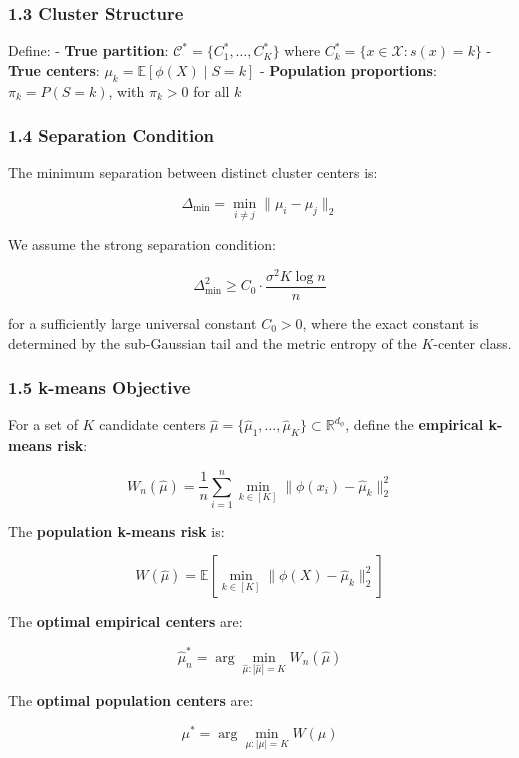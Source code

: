 \documentclass[
  12pt,
]{article}
\begin{document}
\subsubsection{1.3 Cluster Structure}\label{cluster-structure}

Define: - \textbf{True partition}:
\(\mathcal{C}^* = \{C_1^*, \dots, C_K^*\}\) where
\(C_k^* = \{x \in \mathcal{X} : s(x) = k\}\) - \textbf{True centers}:
\(\mu_k = \mathbb{E}[\phi(X) \mid S = k]\) - \textbf{Population
proportions}: \(\pi_k = P(S = k)\), with \(\pi_k > 0\) for all \(k\)

\subsubsection{1.4 Separation Condition}\label{separation-condition}

The minimum separation between distinct cluster centers is:

\[\Delta_{\min} = \min_{i \neq j} \|\mu_i - \mu_j\|_2\]

We assume the strong separation condition:

\[\Delta_{\min}^2 \geq C_0 \cdot \frac{\sigma^2 K \log n}{n}\]

for a sufficiently large universal constant \(C_0 > 0\), where the exact
constant is determined by the sub-Gaussian tail and the metric entropy
of the \(K\)-center class.

\subsubsection{1.5 k-means Objective}\label{k-means-objective}

For a set of \(K\) candidate centers
\(\hat{\mu} = \{\hat{\mu}_1, \dots, \hat{\mu}_K\} \subset \mathbb{R}^{d_\phi}\),
define the \textbf{empirical k-means risk}:

\[W_n(\hat{\mu}) = \frac{1}{n} \sum_{i=1}^n \min_{k \in [K]} \|\phi(x_i) - \hat{\mu}_k\|_2^2\]

The \textbf{population k-means risk} is:

\[W(\hat{\mu}) = \mathbb{E}\left[\min_{k \in [K]} \|\phi(X) - \hat{\mu}_k\|_2^2\right]\]

The \textbf{optimal empirical centers} are:

\[\hat{\mu}_n^* = \arg \min_{\hat{\mu}: |\hat{\mu}| = K} W_n(\hat{\mu})\]

The \textbf{optimal population centers} are:

\[\mu^* = \arg \min_{\mu: |\mu| = K} W(\mu)\]
\end{document}
